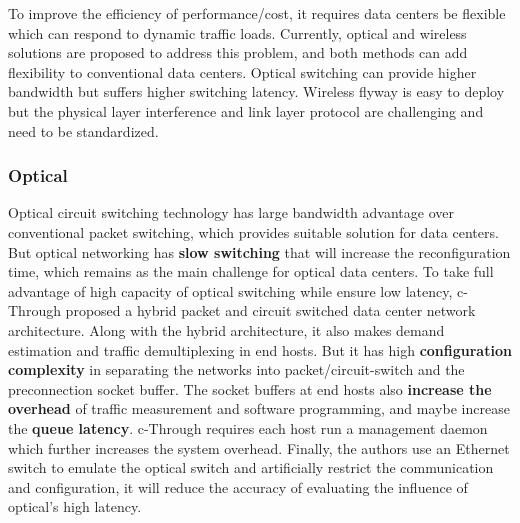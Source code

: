 \documentclass[journal,onecolumn,11pt]{IEEEtran}
\begin{document}
To improve the efficiency of performance/cost, it requires data centers be flexible which can respond to dynamic traffic loads. Currently, optical and wireless solutions are proposed to address this problem, and both methods can add flexibility to conventional data centers. Optical switching can provide higher bandwidth but suffers higher switching latency. Wireless flyway is easy to deploy but the physical layer interference and link layer protocol are challenging and need to be standardized.

\subsubsection{Optical}

Optical circuit switching technology has large bandwidth advantage over conventional packet switching, which provides suitable solution for data centers. But optical networking has \textbf{slow switching} that will increase the reconfiguration time, which remains as the main challenge for optical data centers. To take full advantage of high capacity of optical switching while ensure low latency, c-Through proposed a hybrid packet and circuit switched data center network architecture. Along with the hybrid architecture, it also makes demand estimation and traffic demultiplexing in end hosts. But it has high \textbf{configuration complexity} in separating the networks into packet/circuit-switch and the preconnection socket buffer. The socket buffers at end hosts also \textbf{increase the overhead} of traffic measurement and software programming, and maybe increase the \textbf{queue latency}. c-Through requires each host run a management daemon which further increases the system overhead. Finally, the authors use an Ethernet switch to emulate the optical switch and artificially restrict the communication and configuration, it will reduce the accuracy of evaluating the influence of optical's high latency.

\end{document}
